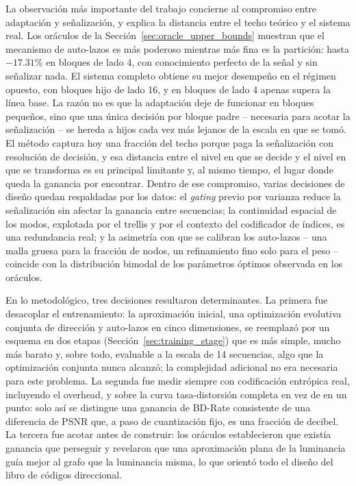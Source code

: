 La observación más importante del trabajo concierne al compromiso entre adaptación y
señalización, y explica la distancia entre el techo teórico y el sistema real. Los oráculos de
la Sección~\ref{sec:oracle_upper_bounds} muestran que el mecanismo de auto-lazos es más
poderoso mientras más fina es la partición: hasta $-17.31\%$ en bloques de lado 4, con
conocimiento perfecto de la señal y sin señalizar nada. El sistema completo obtiene su mejor
desempeño en el régimen opuesto, con bloques hijo de lado 16, y en bloques de lado 4 apenas
supera la línea base. La razón no es que la adaptación deje de funcionar en bloques pequeños,
sino que una única decisión por bloque padre -- necesaria para acotar la señalización -- se
hereda a hijos cada vez más lejanos de la escala en que se tomó. El método captura hoy una
fracción del techo porque paga la señalización con resolución de decisión, y esa distancia
entre el nivel en que se decide y el nivel en que se transforma es su principal limitante y,
al mismo tiempo, el lugar donde queda la ganancia por encontrar. Dentro de ese compromiso,
varias decisiones de diseño quedan respaldadas por los datos: el \textit{gating} previo por
varianza reduce la señalización sin afectar la ganancia entre secuencias; la continuidad
espacial de los modos, explotada por el trellis y por el contexto del codificador de índices,
es una redundancia real; y la asimetría con que se calibran los auto-lazos -- una malla gruesa
para la fracción de nodos, un refinamiento fino solo para el peso -- coincide con la
distribución bimodal de los parámetros óptimos observada en los oráculos.

En lo metodológico, tres decisiones resultaron determinantes. La primera fue desacoplar el
entrenamiento: la aproximación inicial, una optimización evolutiva conjunta de dirección y
auto-lazos en cinco dimensiones, se reemplazó por un esquema en dos etapas
(Sección~\ref{sec:training_stage}) que es más simple, mucho más barato y, sobre todo,
evaluable a la escala de 14 secuencias, algo que la optimización conjunta nunca alcanzó; la
complejidad adicional no era necesaria para este problema. La segunda fue medir siempre con
codificación entrópica real, incluyendo el overhead, y sobre la curva tasa-distorsión completa
en vez de en un punto: solo así se distingue una ganancia de BD-Rate consistente de una
diferencia de PSNR que, a paso de cuantización fijo, es una fracción de decibel. La tercera fue
acotar antes de construir: los oráculos establecieron que existía ganancia que perseguir y
revelaron que una aproximación plana de la luminancia guía mejor al grafo que la luminancia
misma, lo que orientó todo el diseño del libro de códigos direccional.

